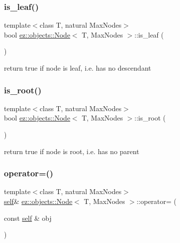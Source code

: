 \subsubsection{\texorpdfstring{is\+\_\+leaf()}{is\_leaf()}}
{\footnotesize\ttfamily template$<$class T, natural Max\+Nodes$>$ \\
bool \hyperlink{classez_1_1objects_1_1Node}{ez\+::objects\+::\+Node}$<$ T, Max\+Nodes $>$\+::is\+\_\+leaf (\begin{DoxyParamCaption}{ }\end{DoxyParamCaption})\hspace{0.3cm}{\ttfamily [inline]}}

return true if node is leaf, i.\+e. has no descendant \mbox{\label{classez_1_1objects_1_1Node_a954a589a87e9d63d8f070ac792a6d95f}} 
\subsubsection{\texorpdfstring{is\+\_\+root()}{is\_root()}}
{\footnotesize\ttfamily template$<$class T, natural Max\+Nodes$>$ \\
bool \hyperlink{classez_1_1objects_1_1Node}{ez\+::objects\+::\+Node}$<$ T, Max\+Nodes $>$\+::is\+\_\+root (\begin{DoxyParamCaption}{ }\end{DoxyParamCaption})\hspace{0.3cm}{\ttfamily [inline]}}

return true if node is root, i.\+e. has no parent \mbox{\label{classez_1_1objects_1_1Node_a057ec528cc64665369c2b25377d231dd}} 
\subsubsection{\texorpdfstring{operator=()}{operator=()}}
{\footnotesize\ttfamily template$<$class T, natural Max\+Nodes$>$ \\
\hyperlink{classez_1_1objects_1_1Node}{self}\& \hyperlink{classez_1_1objects_1_1Node}{ez\+::objects\+::\+Node}$<$ T, Max\+Nodes $>$\+::operator= (\begin{DoxyParamCaption}\item[{const \hyperlink{classez_1_1objects_1_1Node}{self} \&}]{obj }\end{DoxyParamCaption})\hspace{0.3cm}{\ttfamily [inline]}}

